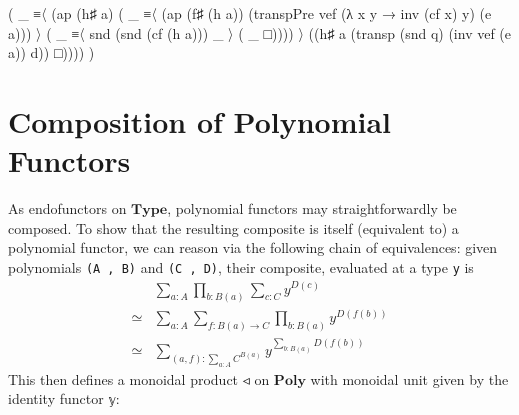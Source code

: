 \documentclass[
  11pt,
  oneside,
  article]{memoir}
\newenvironment{Shaded}{}{}
\newcommand{\NormalTok}[1]{#1}
\newcommand{\OtherTok}[1]{\textcolor[rgb]{0.00,0.44,0.13}{#1}}
\theoremstyle{definition}
\theoremstyle{plain}
\newcommand{\0}{\textsf{0}}
\newcommand{\1}{\tn{\textsf{1}}}
\begin{document}
\begin{Shaded}
\begin{Highlighting}[]
               \OtherTok{(} \OtherTok{\_}\NormalTok{ ≡〈 }\OtherTok{(}\NormalTok{ap }\OtherTok{(}\NormalTok{h♯ a}\OtherTok{)} 
                           \OtherTok{(} \OtherTok{\_}\NormalTok{ ≡〈 }\OtherTok{(}\NormalTok{ap }\OtherTok{(}\NormalTok{f♯ }\OtherTok{(}\NormalTok{h a}\OtherTok{))} 
                                       \OtherTok{(}\NormalTok{transpPre vef }
                                         \OtherTok{(λ}\NormalTok{ x y }\OtherTok{→}\NormalTok{ inv }\OtherTok{(}\NormalTok{cf x}\OtherTok{)}\NormalTok{ y}\OtherTok{)} 
                                         \OtherTok{(}\NormalTok{e a}\OtherTok{)))}\NormalTok{ 〉 }
                           \OtherTok{(} \OtherTok{\_}\NormalTok{ ≡〈 snd }\OtherTok{(}\NormalTok{snd }\OtherTok{(}\NormalTok{cf }\OtherTok{(}\NormalTok{h a}\OtherTok{)))} \OtherTok{\_}\NormalTok{ 〉 }
                           \OtherTok{(} \OtherTok{\_}\NormalTok{ □}\OtherTok{))))}\NormalTok{ 〉}
               \OtherTok{((}\NormalTok{h♯ a }\OtherTok{(}\NormalTok{transp }\OtherTok{(}\NormalTok{snd q}\OtherTok{)} \OtherTok{(}\NormalTok{inv vef }\OtherTok{(}\NormalTok{e a}\OtherTok{))}\NormalTok{ d}\OtherTok{))}\NormalTok{ □}\OtherTok{))))} \OtherTok{)}
\end{Highlighting}
\end{Shaded}

\section{Composition of Polynomial
Functors}\label{composition-of-polynomial-functors}

As endofunctors on \(\mathbf{Type}\), polynomial functors may
straightforwardly be composed. To show that the resulting composite is
itself (equivalent to) a polynomial functor, we can reason via the
following chain of equivalences: given polynomials \texttt{(A\ ,\ B)}
and \texttt{(C\ ,\ D)}, their composite, evaluated at a type \texttt{y}
is \[
\begin{array}{rl}
& \sum_{a : A} \prod_{b : B(a)} \sum_{c : C} y^{D(c)}\\
\simeq & \sum_{a : A} \sum_{f : B(a) \to C} \prod_{b : B(a)} y^{D(f(b))}\\
\simeq & \sum_{(a , f) : \sum_{a : A} C^{B(a)}} y^{\sum_{b : B(a)} D(f(b))}
\end{array}
\] This then defines a monoidal product \(◃\) on \(\mathbf{Poly}\) with
monoidal unit given by the identity functor \texttt{𝕪}:
\end{document}
